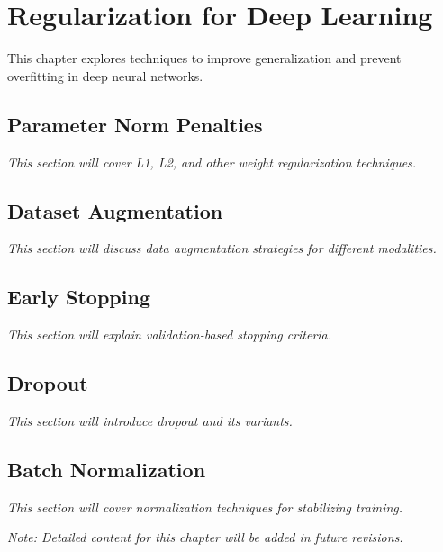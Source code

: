 
\chapter{Regularization for Deep Learning}
\label{chap:regularization}

This chapter explores techniques to improve generalization and prevent overfitting in deep neural networks.

\section{Parameter Norm Penalties}

\textit{This section will cover L1, L2, and other weight regularization techniques.}

\section{Dataset Augmentation}

\textit{This section will discuss data augmentation strategies for different modalities.}

\section{Early Stopping}

\textit{This section will explain validation-based stopping criteria.}

\section{Dropout}

\textit{This section will introduce dropout and its variants.}

\section{Batch Normalization}

\textit{This section will cover normalization techniques for stabilizing training.}

\vspace{1em}
\noindent\textit{Note: Detailed content for this chapter will be added in future revisions.}
